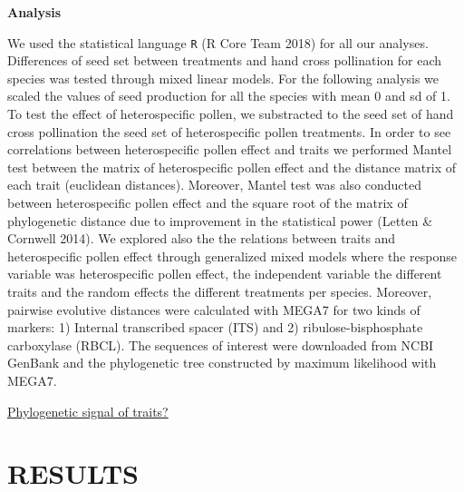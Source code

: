\documentclass[11pt,a4paper]{article}
\begin{document}
\textbf{Analysis}

We used the statistical language \texttt{R} (R Core Team 2018) for all
our analyses. Differences of seed set between treatments and hand cross
pollination for each species was tested through mixed linear models. For
the following analysis we scaled the values of seed production for all
the species with mean 0 and sd of 1. To test the effect of
heterospecific pollen, we substracted to the seed set of hand cross
pollination the seed set of heterospecific pollen treatments. In order
to see correlations between heterospecific pollen effect and traits we
performed Mantel test between the matrix of heterospecific pollen effect
and the distance matrix of each trait (euclidean distances). Moreover,
Mantel test was also conducted between heterospecific pollen effect and
the square root of the matrix of phylogenetic distance due to
improvement in the statistical power (Letten \& Cornwell 2014). We
explored also the the relations between traits and heterospecific pollen
effect through generalized mixed models where the response variable was
heterospecific pollen effect, the independent variable the different
traits and the random effects the different treatments per species.
Moreover, pairwise evolutive distances were calculated with MEGA7 for
two kinds of markers: 1) Internal transcribed spacer (ITS) and 2)
ribulose-bisphosphate carboxylase (RBCL). The sequences of interest were
downloaded from NCBI GenBank and the phylogenetic tree constructed by
maximum likelihood with MEGA7.

\href{Jose}{Phylogenetic signal of traits?}

\newpage

\section{RESULTS}\label{results}
\end{document}
